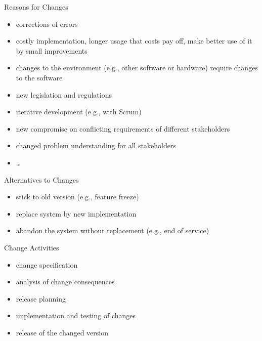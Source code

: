 \begin{frame}{\insertsubsection}
	\begin{fancycolumns}
		\begin{definition}{Reasons for Changes \mysource{\sommerville}}
			\begin{itemize}
				\item corrections of errors
				\item costly implementation, longer usage that costs pay off, make better use of it by small improvements
				\item changes to the environment (e.g., other software or hardware) require changes to the software
				\item new legislation and regulations
				\item iterative development (e.g., with Scrum)
				\item new compromise on conflicting requirements of different stakeholders
				\item changed problem understanding for all stakeholders
				\item \ldots
			\end{itemize}
		\end{definition}
	\nextcolumn
		\begin{note}{Alternatives to Changes}
			\begin{itemize}
				\item stick to old version (e.g., feature freeze)
				\item replace system by new implementation
				\item abandon the system without replacement (e.g., end of service)
			\end{itemize}
		\end{note}
		\begin{definition}{Change Activities \mysource{\sommerville}}
			\begin{itemize}
				\item change specification
				\item analysis of change consequences
				\item release planning
				\item implementation and testing of changes
				\item release of the changed version
			\end{itemize}
		\end{definition}
	\end{fancycolumns}
\end{frame}

